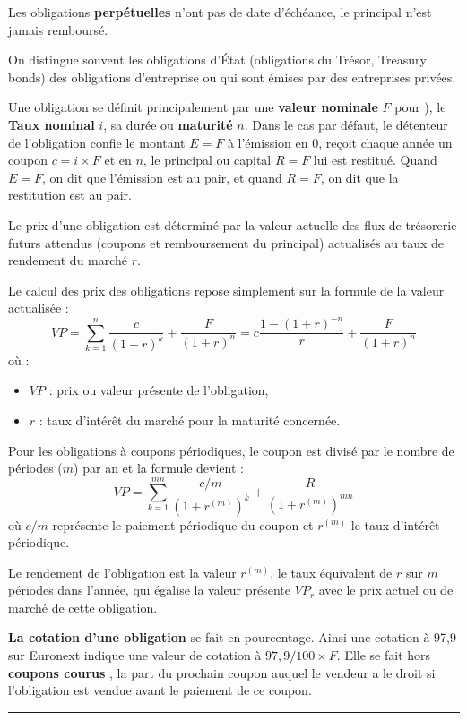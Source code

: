 \begin{f}
Les obligations \textbf{perpétuelles} n'ont pas de date d'échéance, le principal n'est jamais remboursé.
 
On distingue souvent les obligations d'État (obligations du Trésor, Treasury bonds) des
 obligations d'entreprise ou  qui sont émises par des entreprises privées.



Une obligation se définit principalement par une \textbf{valeur nominale} \(F\) pour ), le \textbf{Taux nominal} \(i\), sa durée ou \textbf{maturité} \(n\).
Dans le cas par défaut, le détenteur de l'obligation confie  le montant \(E=F\) à l'émission en 0, reçoit chaque année un coupon \(c=i\times F\) et en \(n\), le principal ou capital \(R=F\) lui est restitué.
Quand \(E=F\), on dit que l'émission est au pair, et quand \(R=F\), on dit que la restitution est au pair.


Le prix d'une obligation est déterminé par la valeur actuelle des flux de trésorerie futurs attendus (coupons et remboursement du principal) actualisés au taux de rendement du marché \(r\).

Le calcul des prix des obligations repose simplement sur la formule de la valeur actualisée :
\[
VP = \sum_{k=1}^{n} \frac{c}{(1 + r)^k} + \frac{F}{(1 + r)^n}=c\frac{1-(1+r)^{-n}}{r}+ \frac{F}{(1 + r)^n}
 \]
où :
\begin{itemize}
	\item \(VP\) : prix ou valeur présente de l'obligation,
	\item \(r\) : taux d'intérêt du marché pour la maturité concernée.
\end{itemize}


Pour les obligations à coupons périodiques, le coupon est divisé par le nombre de périodes (\(m\)) par an et la formule devient :
\[ 
VP = \sum_{k=1}^{mn} \frac{c/m}{(1 + r^{(m)})^k} + \frac{R}{(1  + r^{(m)})^{mn}}
 \]
 où \(c/m\) représente le paiement périodique du coupon et \( r^{(m)}\) le taux d'intérêt périodique.

Le rendement de l'obligation est la valeur \( r^{(m)}\), le taux équivalent de \(r\) sur \(m\) périodes dans l'année,  qui égalise la valeur présente \(VP_r\) avec le prix actuel ou de marché de cette obligation. 

\textbf{La cotation d'une obligation} se fait en pourcentage. Ainsi une cotation à 97,9  sur Euronext indique une valeur de cotation à \(97,9 /100\times F\). 
Elle  se fait hors \textbf{coupons courus} , la part du prochain coupon auquel le vendeur a le droit si l'obligation est vendue avant le paiement de ce coupon.
\end{f}
\hrule

